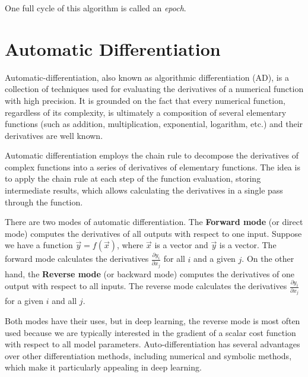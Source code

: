 One full cycle of this algorithm is called an \emph{epoch}.
\section{Automatic Differentiation}\label{sec:AD}

Automatic-differentiation, also known as algorithmic differentiation (AD), is a collection of techniques used for evaluating the derivatives of a numerical function with high precision. It is grounded on the fact that every numerical function, regardless of its complexity, is ultimately a composition of several elementary functions (such as addition, multiplication, exponential, logarithm, etc.) and their derivatives are well known.

Automatic differentiation employs the chain rule to decompose the derivatives of complex functions into a series of derivatives of elementary functions. The idea is to apply the chain rule at each step of the function evaluation, storing intermediate results, which allows calculating the derivatives in a single pass through the function.

There are two modes of automatic differentiation. The \textbf{Forward mode} (or direct mode) computes the derivatives of all outputs with respect to one input. Suppose we have a function $\Vec{y} = f(\Vec{x})$, where $\Vec{x}$ is a vector and $\Vec{y}$ is a vector. The forward mode calculates the derivatives $\frac{\partial y_i}{\partial x_j}$ for all $i$ and a given $j$. On the other hand, the \textbf{Reverse mode} (or backward mode) computes the derivatives of one output with respect to all inputs. The reverse mode calculates the derivatives $\frac{\partial y_i}{\partial x_j}$ for a given $i$ and all $j$.

Both modes have their uses, but in deep learning, the reverse mode is most often used because we are typically interested in the gradient of a scalar cost function with respect to all model parameters.
Auto-differentiation has several advantages over other differentiation methods, including numerical and symbolic methods, which make it particularly appealing in deep learning.

